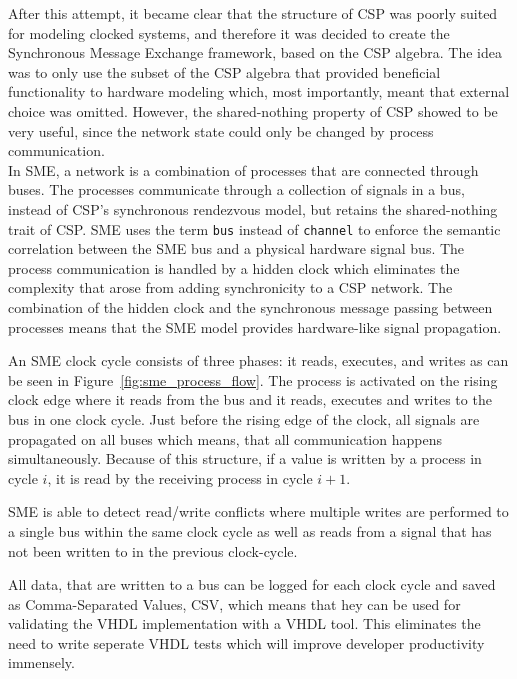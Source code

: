 After this attempt, it became clear that the structure of CSP was poorly suited for modeling clocked systems, and therefore it was decided to create the Synchronous Message Exchange framework, based on the CSP algebra. The idea was to only use the subset of the CSP algebra that provided beneficial functionality to hardware modeling which, most importantly, meant that external choice was omitted. However, the shared-nothing property of CSP showed to be very useful, since the network state could only be changed by process communication.
\\

In SME, a network is a combination of processes that are connected through buses. The processes communicate through a collection of signals in a bus, instead of CSP's synchronous rendezvous model, but retains the shared-nothing trait of CSP.
SME uses the term \texttt{bus} instead of \texttt{channel} to enforce the semantic correlation between the SME bus and a physical hardware signal bus.
The process communication is handled by a hidden clock which eliminates the complexity that arose from adding synchronicity to a CSP network. The combination of the hidden clock and the synchronous message passing between processes means that the SME model provides hardware-like signal propagation.

An SME clock cycle consists of three phases: it reads, executes, and writes as can be seen in Figure~\ref{fig:sme_process_flow}. The process is activated on the rising clock edge where it reads from the bus and it reads, executes and writes to the bus in one clock cycle. Just before the rising edge of the clock, all signals are propagated on all buses which means, that all communication happens simultaneously. Because of this structure, if a value is written by a process in cycle $i$, it is read by the receiving process in cycle $i+1$.

SME is able to detect read/write conflicts where multiple writes are performed to a single bus within the same clock cycle as well as reads from a signal that has not been written to in the previous clock-cycle.

All data, that are written to a bus can be logged for each clock cycle and saved as Comma-Separated Values, CSV, which means that hey can be used for validating the VHDL implementation with a VHDL tool. This eliminates the need to write seperate VHDL tests which will improve developer productivity immensely.

